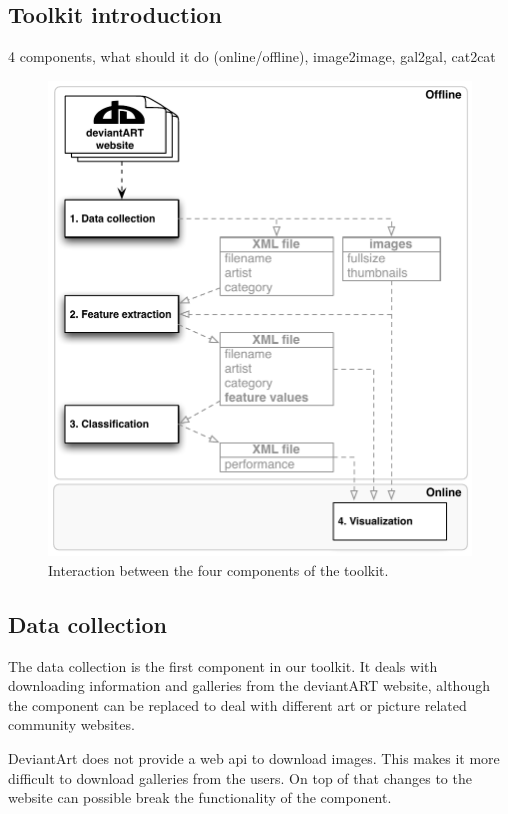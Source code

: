 \subsection{Toolkit introduction}
4 components, what should it do (online/offline), image2image, gal2gal, cat2cat

\begin{figure}[htb]
  \centering
  \includegraphics[width=1\linewidth]{img/components.pdf}
  \caption{Interaction between the four components of the toolkit.}
  \label{fig:components}
\end{figure}

\subsection{Data collection}

The data collection is the first component in our toolkit.
It deals with downloading information and galleries from the deviantART website,
although the component can be replaced to deal with different art or picture related community websites. 

DeviantArt does not provide a web api to download images. This makes it more 
difficult to download galleries from the users. 
On top of that changes to the website can possible break the functionality of the component.

